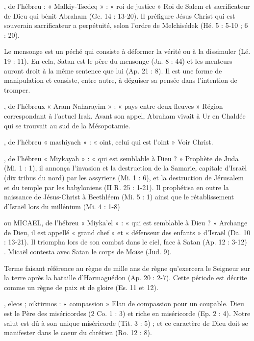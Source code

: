 \begin{multicols}{2}
, de l'hébreu : « Malkiy-Tsedeq » : « roi de justice »
Roi de Salem et sacrificateur de Dieu qui bénit Abraham (Ge. 14 : 13-20). Il préfigure Jésus Christ qui est souverain sacrificateur a perpétuité, selon l'ordre de Melchisédek (Hé. 5 : 5-10 ; 6 : 20).


Le mensonge est un péché qui consiste à déformer la vérité ou à la dissimuler (Lé. 19 : 11). En cela, Satan est le père du mensonge (Jn. 8 : 44) et les menteurs auront droit à la même sentence que lui (Ap. 21 : 8). Il est une forme de manipulation et consiste, entre autre, à déguiser sa pensée dans l'intention de tromper.


, de l'hébreux « Aram Naharayim » : « pays entre deux fleuves »
Région correspondant à l'actuel Irak. Avant son appel, Abraham vivait à Ur en Chaldée qui se trouvait au sud de la Mésopotamie.


, de l'hébreu « mashiyach » : « oint, celui qui est l'oint »
Voir Christ.


, de l'hébreu « Miykayah » : « qui est semblable à Dieu ? »
Prophète de Juda (Mi. 1 : 1), il annonça l'invasion et la destruction de la Samarie, capitale d'Israël (dix tribus du nord) par les assyriens (Mi. 1 : 6), et la destruction de Jérusalem et du temple par les babyloniens (II R. 25 : 1-21). Il prophétisa en outre la naissance de Jésus-Christ à Beethléem (Mi. 5 : 1) ainsi que le rétablissement d'Israël lors du millénium (Mi. 4 : 1-8)


ou MICAEL, de l'hébreu « Miyka'el » : « qui est semblable à Dieu ? »
Archange de Dieu, il est appellé « grand chef » et « défenseur des enfants » d'Israël (Da. 10 : 13-21). Il triompha lors de son combat dans le ciel, face à Satan (Ap. 12 : 3-12) . Micaël contesta avec Satan le corps de Moïse (Jud. 9).


Terme faisant référence au règne de mille ans de règne qu'exercera le Seigneur sur la terre après la bataille d'Harmaguédon (Ap. 20 : 2-7). Cette période est décrite comme un règne de paix et de gloire (Es. 11 et 12).


, eleos ; oiktirmos : « compassion »
Elan de compassion pour un coupable. Dieu est le Père des miséricordes (2 Co. 1 : 3) et riche en miséricorde (Ep. 2 : 4). Notre salut est dû à son unique miséricorde (Tit. 3 : 5) ; et ce caractère de Dieu doit se manifester dans le coeur du chrétien (Ro. 12 : 8).



\end{multicols}
